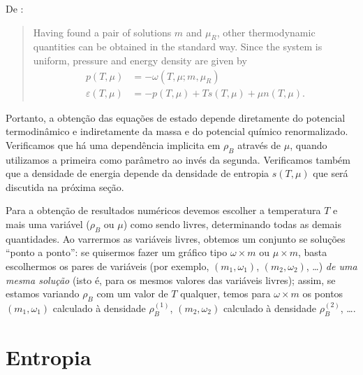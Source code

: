 De \textcite{Buballa}:
\begin{quote}
	Having found a pair of solutions $m$ and $\mu_R$, other thermodynamic quantities can be obtained in the standard way. Since the system is uniform, pressure and energy density are given by
	\begin{align}
		p(T, \mu) &= -\omega(T, \mu; m, \mu_R) \label{Exp_pressao_T}\\
		\varepsilon(T, \mu) &= -p(T, \mu) + T s(T, \mu) + \mu n(T,\mu). \label{Exp_energia_T}
	\end{align}
\end{quote}
%
Portanto, a obtenção das equações de estado depende diretamente do potencial termodinâmico e indiretamente da massa e do potencial químico renormalizado. Verificamos que há uma dependência implicita em $\rho_B$ através de $\mu$, quando utilizamos a primeira como parâmetro ao invés da segunda. Verificamos também que a densidade de energia depende da densidade de entropia $s(T, \mu)$ que será discutida na próxima seção.

Para a obtenção de resultados numéricos devemos escolher a temperatura $T$ e mais uma variável ($\rho_B$ ou $\mu$) como sendo livres, determinando todas as demais quantidades. Ao varrermos as variáveis livres, obtemos um conjunto se soluções ``ponto a ponto'': se quisermos fazer um gráfico tipo $\omega \times m$ ou $\mu \times m$, basta escolhermos os pares de variáveis (por exemplo, $(m_1, \omega_1)$, $(m_2, \omega_2)$, \dots) \emph{de uma mesma solução} (isto é, para os mesmos valores das variáveis livres); assim, se estamos variando $\rho_B$ com um valor de $T$ qualquer, temos para $\omega \times m$ os pontos $(m_1, \omega_1)$ calculado à densidade $\rho_B^{(1)}$, $(m_2, \omega_2)$ calculado à densidade $\rho_B^{(2)}$, \dots.

\section{Entropia}
\label{Sec:Entropia}

